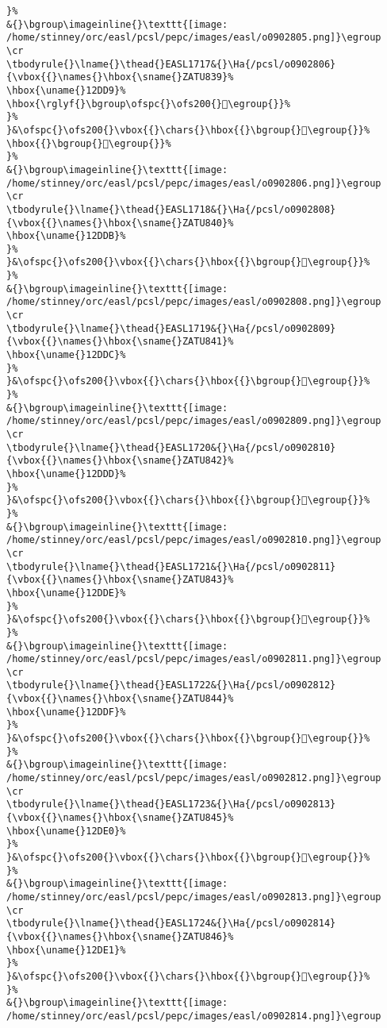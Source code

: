 \begin{verbatim}
}%
&{}\bgroup\imageinline{}\texttt{[image: /home/stinney/orc/easl/pcsl/pepc/images/easl/o0902805.png]}\egroup
\cr
\tbodyrule{}\lname{}\thead{}EASL1717&{}\Ha{/pcsl/o0902806}{\vbox{{}\names{}\hbox{\sname{}ZATU839}%
\hbox{\uname{}12DD9}%
\hbox{\rglyf{}\bgroup\ofspc{}\ofs200{}𒷙\egroup{}}%
}%
}&\ofspc{}\ofs200{}\vbox{{}\chars{}\hbox{{}\bgroup{}𒷙\egroup{}}%
\hbox{{}\bgroup{}𒷚\egroup{}}%
}%
&{}\bgroup\imageinline{}\texttt{[image: /home/stinney/orc/easl/pcsl/pepc/images/easl/o0902806.png]}\egroup
\cr
\tbodyrule{}\lname{}\thead{}EASL1718&{}\Ha{/pcsl/o0902808}{\vbox{{}\names{}\hbox{\sname{}ZATU840}%
\hbox{\uname{}12DDB}%
}%
}&\ofspc{}\ofs200{}\vbox{{}\chars{}\hbox{{}\bgroup{}𒷛\egroup{}}%
}%
&{}\bgroup\imageinline{}\texttt{[image: /home/stinney/orc/easl/pcsl/pepc/images/easl/o0902808.png]}\egroup
\cr
\tbodyrule{}\lname{}\thead{}EASL1719&{}\Ha{/pcsl/o0902809}{\vbox{{}\names{}\hbox{\sname{}ZATU841}%
\hbox{\uname{}12DDC}%
}%
}&\ofspc{}\ofs200{}\vbox{{}\chars{}\hbox{{}\bgroup{}𒷜\egroup{}}%
}%
&{}\bgroup\imageinline{}\texttt{[image: /home/stinney/orc/easl/pcsl/pepc/images/easl/o0902809.png]}\egroup
\cr
\tbodyrule{}\lname{}\thead{}EASL1720&{}\Ha{/pcsl/o0902810}{\vbox{{}\names{}\hbox{\sname{}ZATU842}%
\hbox{\uname{}12DDD}%
}%
}&\ofspc{}\ofs200{}\vbox{{}\chars{}\hbox{{}\bgroup{}𒷝\egroup{}}%
}%
&{}\bgroup\imageinline{}\texttt{[image: /home/stinney/orc/easl/pcsl/pepc/images/easl/o0902810.png]}\egroup
\cr
\tbodyrule{}\lname{}\thead{}EASL1721&{}\Ha{/pcsl/o0902811}{\vbox{{}\names{}\hbox{\sname{}ZATU843}%
\hbox{\uname{}12DDE}%
}%
}&\ofspc{}\ofs200{}\vbox{{}\chars{}\hbox{{}\bgroup{}𒷞\egroup{}}%
}%
&{}\bgroup\imageinline{}\texttt{[image: /home/stinney/orc/easl/pcsl/pepc/images/easl/o0902811.png]}\egroup
\cr
\tbodyrule{}\lname{}\thead{}EASL1722&{}\Ha{/pcsl/o0902812}{\vbox{{}\names{}\hbox{\sname{}ZATU844}%
\hbox{\uname{}12DDF}%
}%
}&\ofspc{}\ofs200{}\vbox{{}\chars{}\hbox{{}\bgroup{}𒷟\egroup{}}%
}%
&{}\bgroup\imageinline{}\texttt{[image: /home/stinney/orc/easl/pcsl/pepc/images/easl/o0902812.png]}\egroup
\cr
\tbodyrule{}\lname{}\thead{}EASL1723&{}\Ha{/pcsl/o0902813}{\vbox{{}\names{}\hbox{\sname{}ZATU845}%
\hbox{\uname{}12DE0}%
}%
}&\ofspc{}\ofs200{}\vbox{{}\chars{}\hbox{{}\bgroup{}𒷠\egroup{}}%
}%
&{}\bgroup\imageinline{}\texttt{[image: /home/stinney/orc/easl/pcsl/pepc/images/easl/o0902813.png]}\egroup
\cr
\tbodyrule{}\lname{}\thead{}EASL1724&{}\Ha{/pcsl/o0902814}{\vbox{{}\names{}\hbox{\sname{}ZATU846}%
\hbox{\uname{}12DE1}%
}%
}&\ofspc{}\ofs200{}\vbox{{}\chars{}\hbox{{}\bgroup{}𒷡\egroup{}}%
}%
&{}\bgroup\imageinline{}\texttt{[image: /home/stinney/orc/easl/pcsl/pepc/images/easl/o0902814.png]}\egroup

\end{verbatim}
